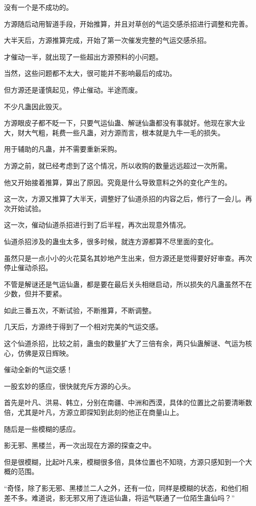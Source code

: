 \begin{this_body}
没有一个是不成功的。

方源随后动用智道手段，开始推算，并且对草创的气运交感杀招进行调整和完善。

大半天后，方源推算完成，开始了第一次催发完整的气运交感杀招。

才催动一半，就出现了一些超出方源预料的小问题。

当然，这些问题都不太大，很可能并不影响最后的成功。

但方源还是谨慎起见，停止催动。半途而废。

不少凡蛊因此毁灭。

方源眼皮子都不眨一下，只要气运仙蛊、解谜仙蛊都没有事就好。他现在家大业大，财大气粗，耗费一些凡蛊，对方源而言，根本就是九牛一毛的损失。

用于辅助的凡蛊，并不需要重新采购。

方源之前，就已经考虑到了这个情况，所以收购的数量远远超过一次所需。

他又开始接着推算，算出了原因。究竟是什么导致意料之外的变化产生的。

这一次，方源又推算了大半天，调整好了仙道杀招的内容之后，修行了一会儿。再次开始试验。

这一次，催动仙道杀招进行到了后半程，再次出现意外情况。

仙道杀招涉及的蛊虫太多，很多时候，就连方源都算不尽里面的变化。

虽然只是一点小小的火花莫名其妙地产生出来，但方源还是觉得要好好审查。再次停止催动杀招。

不管是解谜还是气运仙蛊，都是要在最后关头相继启动，所以损失的凡蛊虽然不在少数，但并不要紧。

如此三番五次，不断试验，不断推算，不断调整。

几天后，方源终于得到了一个相对完美的气运交感。

这个仙道杀招，比较之前，蛊虫的数量扩大了三倍有余，两只仙蛊解谜、气运为核心，仿佛是双日辉映。

催动全新的气运交感！

一股玄妙的感应，很快就充斥方源的心头。

首先是叶凡、洪易、韩立，分别在南疆、中洲和西漠，具体的位置比之前要清晰数倍，尤其是叶凡，方源立即探知到此刻的他正在商量山上。

随后是一些模糊的感应。

影无邪、黑楼兰，再一次出现在方源的探查之中。

但是很模糊，比起叶凡来，模糊很多倍，具体位置也不知晓，方源只感知到一个大概的范围。

“奇怪，除了影无邪、黑楼兰二人之外，还有一位，同样是模糊的状态，和他们相差不多。难道说，影无邪又用了连运仙蛊，将运气联通了一位陌生蛊仙吗？”


\end{this_body}
